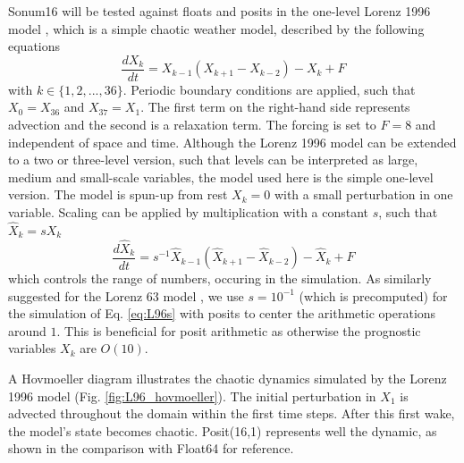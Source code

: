 
Sonum16 will be tested against floats and posits in the one-level Lorenz 1996 model \cite{Hatfield2018,Lorenz1998}, which is a simple chaotic weather model, described by the following equations
\begin{equation}
    \frac{dX_k}{dt} = X_{k-1}(X_{k+1} - X_{k-2}) - X_k + F
    \label{eq:L96}
\end{equation}
with $k \in \{1,2,...,36\}$. Periodic boundary conditions are applied, such that $X_{0} = X_{36}$ and $X_{37} = X_1$. The first term on the right-hand side represents advection and the second is a relaxation term. The forcing is set to $F=8$ and independent of space and time. Although the Lorenz 1996 model can be extended to a two or three-level version, such that levels can be interpreted as large, medium and small-scale variables, the model used here is the simple one-level version. The model is spun-up from rest $X_k = 0$ with a small perturbation in one variable. Scaling can be applied by multiplication with a constant $s$, such that $\hat{X}_k = sX_k$
\begin{equation}
    \frac{d\hat{X}_k}{dt} = s^{-1}\hat{X}_{k-1}(\hat{X}_{k+1} - \hat{X}_{k-2}) - \hat{X}_k + F
    \label{eq:L96s}
\end{equation}
which controls the range of numbers, occuring in the simulation. As similarly suggested for the Lorenz 63 model \citep{Klower2019}, we use $s=10^{-1}$ (which is precomputed) for the simulation of Eq. \ref{eq:L96s} with posits to center the arithmetic operations around $1$. This is beneficial for posit arithmetic as otherwise the prognostic variables $X_k$ are $O(10)$.


A Hovmoeller diagram illustrates the chaotic dynamics simulated by the Lorenz 1996 model (Fig. \ref{fig:L96_hovmoeller}). The initial perturbation in $X_1$ is advected throughout the domain within the first time steps. After this first wake, the model's state becomes chaotic. Posit(16,1) represents well the dynamic, as shown in the comparison with Float64 for reference.

